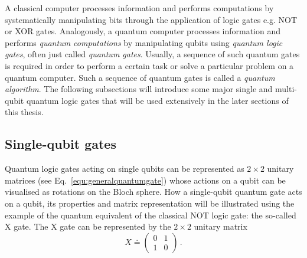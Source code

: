 A classical computer processes information and performs computations by systematically manipulating bits through the application of logic gates e.g. NOT or XOR gates. Analogously, a quantum computer processes information and performs \emph{quantum computations} by manipulating qubits using \emph{quantum logic gates}, often just called \emph{quantum gates}. Usually, a sequence of such quantum gates is required in order to perform a certain task or solve a particular problem on a quantum computer. Such a sequence of quantum gates is called a \emph{quantum algorithm}. The following subsections will introduce some major single and multi-qubit quantum logic gates that will be used extensively in the later sections of this thesis.

\subsection{Single-qubit gates}
\label{subsubsec:singlequbitgates} 
Quantum logic gates acting on single qubits can be represented as $2\times2$ unitary matrices (see Eq.~\ref{equ:generalquantumgate}) whose actions on a qubit can be visualised as rotations on the Bloch sphere. How a single-qubit quantum gate acts on a qubit, its properties and matrix representation will be illustrated using the example of the quantum equivalent of the classical NOT logic gate: the so-called X gate. The X gate can be represented by the $2\times2$ unitary matrix
\begin{equation}
X \doteq \begin{pmatrix}
 0 & 1 \\ 
 1 & 0
 \end{pmatrix}\, .
\end{equation}

